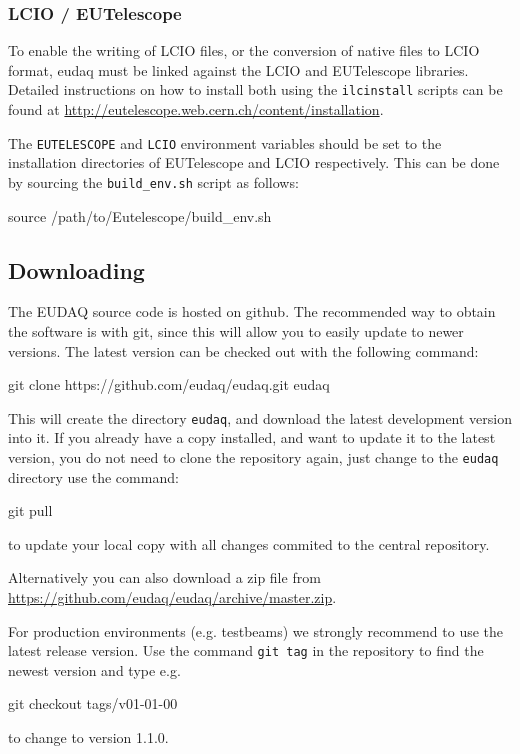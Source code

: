\subsubsection{LCIO / EUTelescope}\label{sec:LCIO-EUTel}
To enable the writing of \gls{LCIO} files, or the conversion of native files to \gls{LCIO} format,
eudaq must be linked against the \gls{LCIO} and EUTelescope libraries.
Detailed instructions on how to install both using the
\texttt{ilcinstall} scripts can be found at \url{http://eutelescope.web.cern.ch/content/installation}.

The \texttt{EUTELESCOPE} and \texttt{LCIO} environment variables should be set to the
installation directories of EUTelescope and LCIO respectively.
This can be done by sourcing the \texttt{build\_env.sh} script as follows:
\begin{listing}[mybash]
source /path/to/Eutelescope/build_env.sh
\end{listing}

\subsection{Downloading}
The EUDAQ source code is hosted on github. The recommended way to obtain the software is with git,
since this will allow you to easily update to newer versions.
The latest version can be checked out with the following command:
\begin{listing}[mybash]
git clone https://github.com/eudaq/eudaq.git eudaq
\end{listing}

This will create the directory \texttt{eudaq}, and download the latest
development version into it. 
If you already have a copy installed, and want to update it to the
latest version, you do not need to clone the repository again, just change to the \texttt{eudaq} directory use the command:
\begin{listing}[mybash]
git pull
\end{listing}
to update your local copy with all changes commited to the central repository.

Alternatively you can also download a zip file from
\url{https://github.com/eudaq/eudaq/archive/master.zip}.

For production environments (e.g. testbeams) we strongly recommend to
use the latest release version. Use the command \texttt{git tag} in
the repository to find the newest version and type e.g. 
\begin{listing}[mybash]
git checkout tags/v01-01-00
\end{listing}
to change to version 1.1.0.


